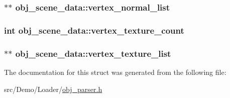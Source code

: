 \hypertarget{structobj__scene__data_a8407af16c78de18ecb879dc627109560}{
\subsubsection[{vertex\+\_\+normal\+\_\+list}]{$\ast$$\ast$ obj\+\_\+scene\+\_\+data\+::vertex\+\_\+normal\+\_\+list}}\label{structobj__scene__data_a8407af16c78de18ecb879dc627109560}
\hypertarget{structobj__scene__data_a4e288061a4b1b178d1b6ed786aace9c3}{
\subsubsection[{vertex\+\_\+texture\+\_\+count}]{\setlength{\rightskip}{0pt plus 5cm}int obj\+\_\+scene\+\_\+data\+::vertex\+\_\+texture\+\_\+count}}\label{structobj__scene__data_a4e288061a4b1b178d1b6ed786aace9c3}
\hypertarget{structobj__scene__data_a31170ee75ff892af0c72eace0c6da368}{
\subsubsection[{vertex\+\_\+texture\+\_\+list}]{$\ast$$\ast$ obj\+\_\+scene\+\_\+data\+::vertex\+\_\+texture\+\_\+list}}\label{structobj__scene__data_a31170ee75ff892af0c72eace0c6da368}


The documentation for this struct was generated from the following file\+:\begin{DoxyCompactItemize}
\item 
src/\+Demo/\+Loader/\hyperlink{obj__parser_8h}{obj\+\_\+parser.\+h}\end{DoxyCompactItemize}
